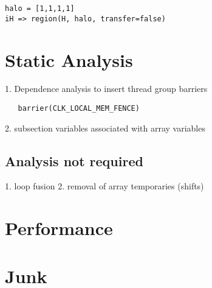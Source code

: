 \documentclass[10pt, conference, compsocconf]{IEEEtran}
\begin{document}
\begin{verbatim}
halo = [1,1,1,1]
iH => region(H, halo, transfer=false)
\end{verbatim}

\section{Static Analysis}

1. Dependence analysis to insert thread group barriers

\begin{verbatim}
   barrier(CLK_LOCAL_MEM_FENCE)
\end{verbatim}

2. subsection variables associated with array variables

\subsection{Analysis not required}

1. loop fusion
2. removal of array temporaries (shifts)

\section{Performance}

\section{Junk}

\cite{chamberlain04zpl, roth97stencils}



\end{document}
